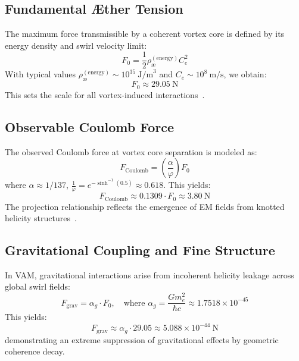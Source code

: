 \documentclass[12pt]{article}
\begin{document}
            \subsection{Fundamental Æther Tension}
        
            The maximum force transmissible by a coherent vortex core is defined by its energy density and swirl velocity limit:
            \begin{equation}
                F_0 = \frac{1}{2} \rho_{\text{\ae}}^{(\text{energy})} C_e^2
            \label{eq:max_core_force}
            \end{equation}
            With typical values \( \rho_{\text{\ae}}^{(\text{energy})} \sim 10^{35}~\text{J/m}^3 \) and \( C_e \sim 10^8~\text{m/s} \), we obtain:
            \begin{equation}
                F_0 \approx 29.05~\text{N}
            \end{equation}
            This sets the scale for all vortex-induced interactions~\cite{volovik2003universe}.
        
            \subsection{Observable Coulomb Force}
            The observed Coulomb force at vortex core separation is modeled as:
            \begin{equation}
                F_\text{Coulomb} = \left( \frac{\alpha}{\varphi} \right) F_0
            \end{equation}
            where \( \alpha \approx 1/137 \), \( \frac{1}{\varphi} = e^{-\sinh^{-1}(0.5)} \approx 0.618 \). This yields:
            \begin{equation}
                F_\text{Coulomb} \approx 0.1309 \cdot F_0 \approx 3.80~\text{N}
            \end{equation}
            The projection relationship reflects the emergence of EM fields from knotted helicity structures~\cite{kiehn2005topological}.
        
            \subsection{Gravitational Coupling and Fine Structure}
        
            In VAM, gravitational interactions arise from incoherent helicity leakage across global swirl fields:
            \begin{equation}
                F_\text{grav} = \alpha_g \cdot F_0, \quad \text{where } \alpha_g = \frac{G m_e^2}{\hbar c} \approx 1.7518 \times 10^{-45}
            \label{eq:gravitational_scaling}
            \end{equation}
            This yields:
            \begin{equation}
                F_\text{grav} \approx \alpha_g \cdot 29.05 \approx 5.088 \times 10^{-44}~\text{N}
            \end{equation}
            demonstrating an extreme suppression of gravitational effects by geometric coherence decay.
        
\end{document}
